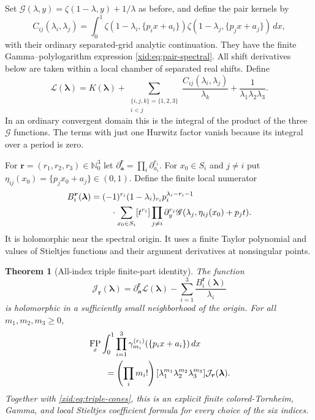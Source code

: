 \documentclass[11pt,a4paper]{article}
\numberwithin{equation}{section}
\newtheorem{theorem}{Theorem}[section]
\theoremstyle{definition}
\theoremstyle{remark}
\DeclareMathOperator{\FP}{FP}
\begin{document}
Set $\mathscr G(\lambda,y)=\zeta(1-\lambda,y)+1/\lambda$ as before,
and define the pair kernels by
\[
 C_{ij}(\lambda_i,\lambda_j)
 =\int_0^1\zeta(1-\lambda_i,\{p_ix+a_i\})
                \zeta(1-\lambda_j,\{p_jx+a_j\})\,dx,
\]
with their ordinary separated-grid analytic continuation.
They have the finite Gamma--polylogarithm expression
\eqref{xid:eq:pair-spectral}. All shift derivatives below are taken within
a local chamber of separated real shifts. Define
\begin{equation}\label{xid:eq:triple-regular-spectral}
 \mathcal L(\boldsymbol\lambda)
 =K(\boldsymbol\lambda)+\sum_{\substack{\{i,j,k\}=\{1,2,3\}\\i<j}}
       \frac{C_{ij}(\lambda_i,\lambda_j)}{\lambda_k}
       +\frac1{\lambda_1\lambda_2\lambda_3}.
\end{equation}
In an ordinary convergent domain this is the integral of the product
of the three $\mathscr G$ functions.  The terms with just one Hurwitz
factor vanish because its integral over a period is zero.

For $\boldsymbol r=(r_1,r_2,r_3)\in\mathbb N_0^3$ let
$\partial_{\boldsymbol a}^{\boldsymbol r}=\prod_i\partial_{a_i}^{r_i}$.
For $x_0\in S_i$ and $j\ne i$ put
$\eta_{ij}(x_0)=\{p_jx_0+a_j\}\in(0,1)$.  Define the finite local
numerator
\begin{align}
 B_i^{\boldsymbol r}(\boldsymbol\lambda)
 ={}&(-1)^{r_i}(1-\lambda_i)_{r_i}
          p_i^{\lambda_i-r_i-1}\notag\\
 &\quad\cdot\sum_{x_0\in S_i}[t^{r_i}]
   \prod_{j\ne i}\partial_y^{r_j}
          \mathscr G(\lambda_j,\eta_{ij}(x_0)+p_jt).
 \label{xid:eq:triple-local-B}
\end{align}
It is holomorphic near the spectral origin.  It uses a finite Taylor
polynomial and values of Stieltjes functions and their argument
derivatives at nonsingular points.

\begin{theorem}[All-index triple finite-part identity]
\label{xid:thm:triple-FP}
The function
\begin{equation}\label{xid:eq:triple-holomorphic-J}
 \mathcal J_{\boldsymbol r}(\boldsymbol\lambda)
 =\partial_{\boldsymbol a}^{\boldsymbol r}
       \mathcal L(\boldsymbol\lambda)
       -\sum_{i=1}^3\frac{B_i^{\boldsymbol r}(\boldsymbol\lambda)}{\lambda_i}
\end{equation}
is holomorphic in a sufficiently small neighborhood of the origin.
For all $m_1,m_2,m_3\ge0$,
\begin{align}
 &\FP_x\int_0^1\prod_{i=1}^3
       \gamma_{m_i}^{(r_i)}(\{p_ix+a_i\})\,dx\notag\\
 &\qquad=\left(\prod_i m_i!\right)
       [\lambda_1^{m_1}\lambda_2^{m_2}\lambda_3^{m_3}]
          \mathcal J_{\boldsymbol r}(\boldsymbol\lambda).
 \label{xid:eq:triple-FP-value}
\end{align}
Together with \eqref{xid:eq:triple-cones}, this is an explicit finite
colored-Tornheim, Gamma, and local Stieltjes coefficient formula for
every choice of the six indices.
\end{theorem}
\end{document}
